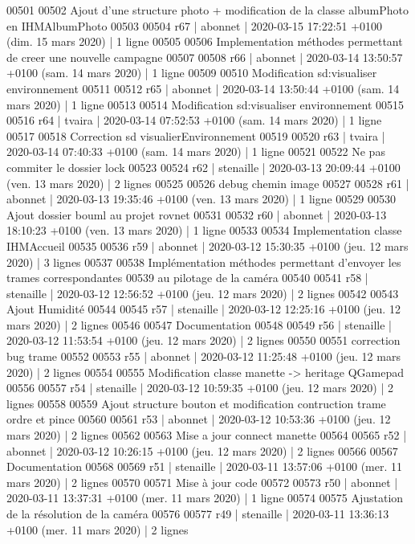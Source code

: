 \begin{DoxyCode}
00501 
00502 Ajout d'une structure photo + modification de la classe albumPhoto en IHMAlbumPhoto
00503 
00504 r67 | abonnet | 2020-03-15 17:22:51 +0100 (dim. 15 mars 2020) | 1 ligne
00505 
00506 Implementation méthodes permettant de creer une nouvelle campagne
00507 
00508 r66 | abonnet | 2020-03-14 13:50:57 +0100 (sam. 14 mars 2020) | 1 ligne
00509 
00510 Modification sd:visualiser environnement
00511 
00512 r65 | abonnet | 2020-03-14 13:50:44 +0100 (sam. 14 mars 2020) | 1 ligne
00513 
00514 Modification sd:visualiser environnement
00515 
00516 r64 | tvaira | 2020-03-14 07:52:53 +0100 (sam. 14 mars 2020) | 1 ligne
00517 
00518 Correction sd visualierEnvironnement
00519 
00520 r63 | tvaira | 2020-03-14 07:40:33 +0100 (sam. 14 mars 2020) | 1 ligne
00521 
00522 Ne pas commiter le dossier lock
00523 
00524 r62 | stenaille | 2020-03-13 20:09:44 +0100 (ven. 13 mars 2020) | 2 lignes
00525 
00526 debug chemin image
00527 
00528 r61 | abonnet | 2020-03-13 19:35:46 +0100 (ven. 13 mars 2020) | 1 ligne
00529 
00530 Ajout dossier bouml au projet rovnet
00531 
00532 r60 | abonnet | 2020-03-13 18:10:23 +0100 (ven. 13 mars 2020) | 1 ligne
00533 
00534 Implementation classe IHMAccueil
00535 
00536 r59 | abonnet | 2020-03-12 15:30:35 +0100 (jeu. 12 mars 2020) | 3 lignes
00537 
00538 Implémentation méthodes permettant d'envoyer les trames correspondantes
00539 au pilotage de la caméra
00540 
00541 r58 | stenaille | 2020-03-12 12:56:52 +0100 (jeu. 12 mars 2020) | 2 lignes
00542 
00543 Ajout Humidité
00544 
00545 r57 | stenaille | 2020-03-12 12:25:16 +0100 (jeu. 12 mars 2020) | 2 lignes
00546 
00547 Documentation
00548 
00549 r56 | stenaille | 2020-03-12 11:53:54 +0100 (jeu. 12 mars 2020) | 2 lignes
00550 
00551 correction bug trame
00552 
00553 r55 | abonnet | 2020-03-12 11:25:48 +0100 (jeu. 12 mars 2020) | 2 lignes
00554 
00555 Modification classe manette -> heritage QGamepad
00556 
00557 r54 | stenaille | 2020-03-12 10:59:35 +0100 (jeu. 12 mars 2020) | 2 lignes
00558 
00559 Ajout structure bouton et modification contruction trame ordre et pince
00560 
00561 r53 | abonnet | 2020-03-12 10:53:36 +0100 (jeu. 12 mars 2020) | 2 lignes
00562 
00563 Mise a jour connect manette
00564 
00565 r52 | abonnet | 2020-03-12 10:26:15 +0100 (jeu. 12 mars 2020) | 2 lignes
00566 
00567 Documentation
00568 
00569 r51 | stenaille | 2020-03-11 13:57:06 +0100 (mer. 11 mars 2020) | 2 lignes
00570 
00571 Mise à jour code
00572 
00573 r50 | abonnet | 2020-03-11 13:37:31 +0100 (mer. 11 mars 2020) | 1 ligne
00574 
00575 Ajustation de la résolution de la caméra
00576 
00577 r49 | stenaille | 2020-03-11 13:36:13 +0100 (mer. 11 mars 2020) | 2 lignes

\end{DoxyCode}
